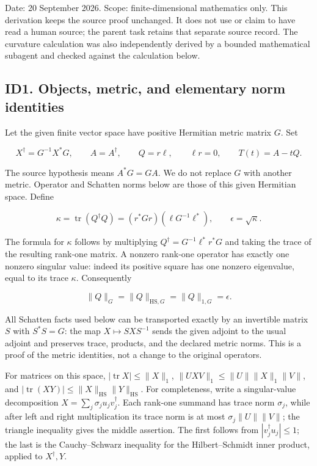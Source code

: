 Date: 20 September 2026. Scope: finite-dimensional mathematics only. This derivation keeps the source proof unchanged. It does not use or claim to have read a human source; the parent task retains that separate source record. The curvature calculation was also independently derived by a bounded mathematical subagent and checked against the calculation below.

\subsection{ID1. Objects, metric, and elementary norm identities}\label{nhi:id1.-objects-metric-and-elementary-norm-identities}

Let the given finite vector space have positive Hermitian metric matrix \(G\). Set

\[
X^\dagger=G^{-1}X^*G,\qquad
A=A^\dagger,\qquad Q=r\ell,\qquad \ell r=0,\qquad T(t)=A-tQ.
\]

The source hypothesis means \(A^*G=GA\). We do not replace \(G\) with another metric. Operator and Schatten norms below are those of this given Hermitian space. Define

\[
\kappa=\operatorname{tr}(Q^\dagger Q)
=(r^*Gr)(\ell G^{-1}\ell^*),\qquad \epsilon=\sqrt\kappa.
\]

The formula for \(\kappa\) follows by multiplying \(Q^\dagger=G^{-1}\ell^*r^*G\) and taking the trace of the resulting rank-one matrix. A nonzero rank-one operator has exactly one nonzero singular value: indeed its positive square has one nonzero eigenvalue, equal to its trace \(\kappa\). Consequently

\[
\|Q\|_G=\|Q\|_{\mathrm{HS},G}=\|Q\|_{1,G}=\epsilon.
\]

All Schatten facts used below can be transported exactly by an invertible matrix \(S\) with \(S^*S=G\): the map \(X\mapsto SXS^{-1}\) sends the given adjoint to the usual adjoint and preserves trace, products, and the declared metric norms. This is a proof of the metric identities, not a change to the original operators.

For matrices on this space, \(|\operatorname{tr}X|\le\|X\|_1\), \(\|UXV\|_1\le\|U\|\|X\|_1\|V\|\), and \(|\operatorname{tr}(XY)|\le\|X\|_{\mathrm{HS}}\|Y\|_{\mathrm{HS}}\). For completeness, write a singular-value decomposition \(X=\sum_j\sigma_j u_jv_j^\dagger\). Each rank-one summand has trace norm \(\sigma_j\), while after left and right multiplication its trace norm is at most \(\sigma_j\|U\|\|V\|\); the triangle inequality gives the middle assertion. The first follows from \(|v_j^\dagger u_j|\le1\); the last is the Cauchy--Schwarz inequality for the Hilbert--Schmidt inner product, applied to \(X^\dagger,Y\).


